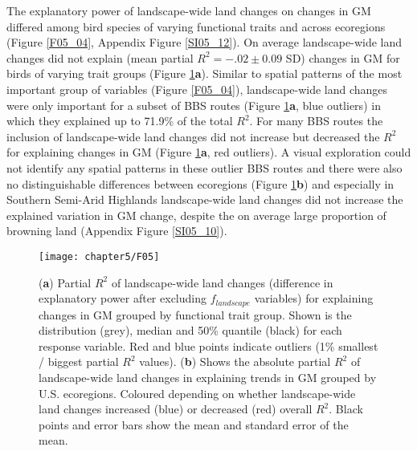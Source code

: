 The explanatory power of landscape-wide land changes on changes in GM differed among bird species of varying functional traits and across ecoregions (Figure \ref{F05_04}, Appendix Figure \ref{SI05_12}). On average landscape-wide land changes did not explain (mean partial $R^2 = -.02 \pm 0.09$ SD) changes in GM for birds of varying trait groups (Figure \ref{F05_05}\textbf{a}). Similar to spatial patterns of the most important group of variables (Figure \ref{F05_04}), landscape-wide land changes were only important for a subset of BBS routes (Figure \ref{F05_05}\textbf{a}, blue outliers) in which they explained up to 71.9\% of the total $R^2$. For many BBS routes the inclusion of landscape-wide land changes did not increase but decreased the $R^2$ for explaining changes in GM (Figure \ref{F05_05}\textbf{a}, red outliers). A visual exploration could not identify any spatial patterns in these outlier BBS routes and there were also no distinguishable differences between ecoregions (Figure \ref{F05_05}\textbf{b}) and especially in Southern Semi-Arid Highlands landscape-wide land changes did not increase the explained variation in GM change, despite the on average large proportion of browning land (Appendix Figure \ref{SI05_10}).

\begin{figure}[htb]
\centering
\texttt{[image: chapter5/F05]}
\caption{(\textbf{a}) Partial $R^2$ of landscape-wide land changes (difference in explanatory power after excluding $f_{landscape}$ variables) for explaining changes in GM grouped by functional trait group. Shown is the distribution (grey), median and 50\% quantile (black) for each response variable. Red and blue points indicate outliers (1\% smallest / biggest partial $R^2$ values). (\textbf{b}) Shows the absolute partial $R^2$ of landscape-wide land changes in explaining trends in GM grouped by U.S. ecoregions. Coloured depending on whether landscape-wide land changes increased (blue) or decreased (red) overall $R^2$. Black points and error bars show the mean and standard error of the mean.}
\label{F05_05}
\end{figure}
